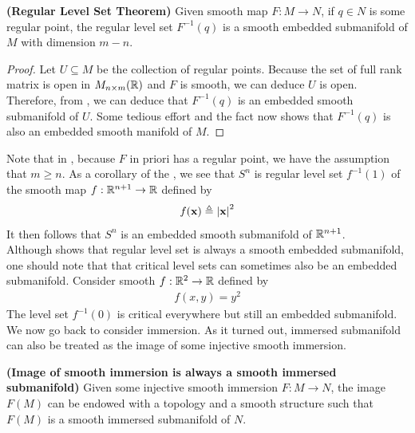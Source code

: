 \documentclass{report}
\begin{document}
\begin{theorem}
\label{Regular Level Set Theorem}
\textbf{(Regular Level Set Theorem)} Given smooth map $F:M\rightarrow N$, if $q\in N$ is some regular point, the regular level set $F^{-1}(q)$ is a smooth embedded submanifold of $M$ with dimension  $m-n$. 
\end{theorem}
\begin{proof}
  Let $U\subseteq M$  be the collection of regular points.  Because the set of full rank matrix is open in  $M_{n\times m}(\mathbb{R})$ and $F$ is smooth, we can deduce  $U$ is open. Therefore, from , we can deduce that $F^{-1}(q)$ is an embedded smooth submanifold of $U$. Some tedious effort and the fact  now shows that $F^{-1}(q)$ is also an embedded smooth manifold of $M$. 
\end{proof}
\begin{mdframed}
Note that in , because $F$ in priori has a regular point, we have the assumption that  $m\geq n$. As a corollary of the , we see that  $S^n$ is regular level set  $f^{-1}(1)$ of the smooth map $f:\mathbb{R}^{n+1}\rightarrow \mathbb{R}$ defined by 
\begin{align*}
f(\textbf{x})\triangleq \left|\textbf{x}\right|^2
\end{align*}
It then follows that $S^n$ is an embedded smooth submanifold of  $\mathbb{R}^{n+1}$.\\

Although  shows that regular level set is always a smooth embedded submanifold, one should note that that critical level sets can sometimes also be an embedded submanifold. Consider smooth $f:\mathbb{R}^2 \rightarrow \mathbb{R}$ defined by 
\begin{align*}
f(x,y)=y^2
\end{align*}
The level set $f^{-1}(0)$ is critical everywhere but still an embedded submanifold.\\

We now go back to consider immersion. As it turned out, immersed submanifold can also be treated as the image of some injective smooth immersion. 
\end{mdframed}
\begin{theorem}
\label{Iosi}
\textbf{(Image of smooth immersion is always a smooth immersed submanifold)} Given some injective smooth immersion $F:M\rightarrow N$, the image $F(M)$ can be endowed with a topology and a smooth structure such that $F(M)$ is a smooth immersed submanifold of $N$. 
\end{theorem}
\end{document}
